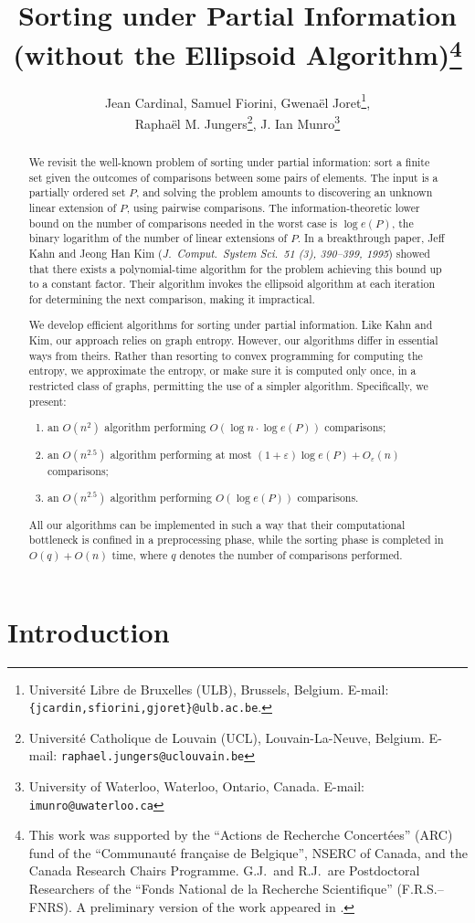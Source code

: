 \documentclass{article} \usepackage{fullpage}
\title{Sorting under Partial Information\\
(without the Ellipsoid Algorithm)\footnote{This work was supported by the ``Actions de Recherche Concert\'ees'' (ARC) fund of the ``Communaut\'e fran\c{c}aise de Belgique'', NSERC of Canada, and the Canada Research Chairs Programme. G.J.\ and R.J.\ are Postdoctoral Researchers of the ``Fonds National de la Recherche Scientifique'' (F.R.S.--FNRS). A preliminary version of the work appeared in \cite{SUPI-STOC}.}}
\date{}
\author{Jean Cardinal, Samuel Fiorini, Gwena\"el Joret\footnote{Universit\'e Libre de Bruxelles (ULB), Brussels, Belgium. {E-mail: \tt\small \{jcardin,sfiorini,gjoret\}@ulb.ac.be}.},\\ 
Rapha\"el M. Jungers\footnote{Universit\'e Catholique de Louvain (UCL), Louvain-La-Neuve, Belgium. {E-mail: \tt\small raphael.jungers@uclouvain.be}}, J. Ian Munro\footnote{University of Waterloo, Waterloo, Ontario, Canada. {E-mail: \tt\small imunro@uwaterloo.ca}}
}
\begin{document}
\maketitle

\sloppy

\begin{abstract}
We revisit the well-known problem of sorting under partial information: sort a finite set given the outcomes of comparisons between some pairs of elements. The input is a partially ordered set $P$, and solving the problem amounts to discovering an unknown linear extension of $P$, using pairwise comparisons. The information-theoretic lower bound on the number of comparisons needed in the worst case is $\log e(P)$, the binary logarithm of the number of linear extensions of $P$. In a breakthrough paper, Jeff Kahn and Jeong Han Kim ({\em J.\ Comput.\ System Sci.\ 51 (3), 390--399, 1995}) showed that there exists a polynomial-time algorithm for the problem achieving this bound up to a constant factor. Their algorithm invokes the ellipsoid algorithm at each iteration for determining the next comparison, making it impractical.

We develop efficient algorithms for sorting under partial information. Like Kahn and Kim, our approach relies on graph entropy. However, our algorithms differ in essential ways from theirs. Rather than resorting to convex programming for computing the entropy, we approximate the entropy, or make sure it is computed only once, in a restricted class of graphs, permitting the use of a simpler algorithm. Specifically, we present:
\begin{enumerate}
\item an $O(n^2)$ algorithm performing $O(\log n\cdot \log e(P))$ comparisons;
\item an $O(n^{2.5})$ algorithm performing at most $(1+\varepsilon) \log e(P) + O_\varepsilon(n)$ comparisons;
\item an $O(n^{2.5})$ algorithm performing $O(\log e(P))$ comparisons.
\end{enumerate}
All our algorithms can be implemented in such a way that their computational bottleneck is confined in a preprocessing phase, while the sorting phase is completed in $O(q) + O(n)$ time, where $q$ denotes the number of comparisons performed.
\end{abstract}

\newpage
\section{Introduction}
\end{document}
